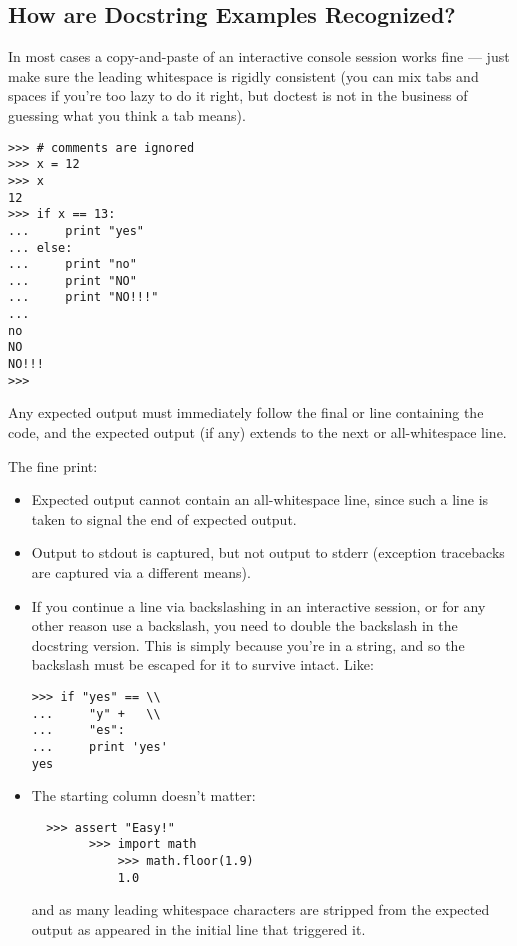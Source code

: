 \subsection{How are Docstring Examples Recognized?}

In most cases a copy-and-paste of an interactive console session works fine
--- just make sure the leading whitespace is rigidly consistent (you can mix
tabs and spaces if you're too lazy to do it right, but doctest is not in
the business of guessing what you think a tab means).

\begin{verbatim}
>>> # comments are ignored
>>> x = 12
>>> x
12
>>> if x == 13:
...     print "yes"
... else:
...     print "no"
...     print "NO"
...     print "NO!!!"
...
no
NO
NO!!!
>>>
\end{verbatim}

Any expected output must immediately follow the final
 or  line containing the code, and
the expected output (if any) extends to the next 
or all-whitespace line.

The fine print:

\begin{itemize}

\item Expected output cannot contain an all-whitespace line, since such a
  line is taken to signal the end of expected output.

\item Output to stdout is captured, but not output to stderr (exception
  tracebacks are captured via a different means).

\item If you continue a line via backslashing in an interactive session, or
  for any other reason use a backslash, you need to double the backslash in
  the docstring version.  This is simply because you're in a string, and so
  the backslash must be escaped for it to survive intact.  Like:

\begin{verbatim}
>>> if "yes" == \\
...     "y" +   \\
...     "es":
...     print 'yes'
yes
\end{verbatim}

\item The starting column doesn't matter:

\begin{verbatim}
  >>> assert "Easy!"
        >>> import math
            >>> math.floor(1.9)
            1.0
\end{verbatim}

and as many leading whitespace characters are stripped from the
expected output as appeared in the initial  line
that triggered it.
\end{itemize}

